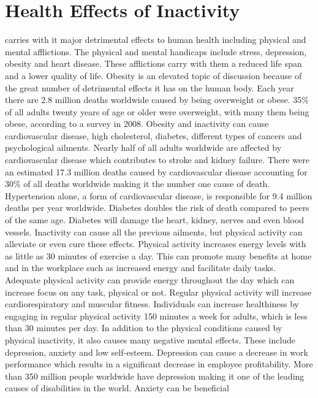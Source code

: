 \documentclass[12pt,article]{IEEEtran}
\begin{document}
	\section{Health Effects of Inactivity}
	 carries with it major detrimental effects to human health including physical and mental afflictions. 
	The physical and mental handicaps include stress, depression, obesity and heart disease. These afflictions carry with them a reduced 
	life span and a lower quality of life.
	Obesity is an elevated topic of discussion because of the great number of detrimental effects it has on the human body. Each year there 
	are 2.8 million deaths worldwide caused by being overweight or obese. 35\% of all adults twenty years of age or older were overweight, 
	with many them being obese, according to a survey in 2008. \cite{14} Obesity and inactivity can cause cardiovascular disease, high cholesterol, 
	diabetes, different types of cancers and psychological ailments. Nearly half of all adults worldwide are affected by cardiovascular disease
	which contributes to stroke and kidney failure. There were an estimated 17.3 million deaths caused by cardiovascular disease accounting for 
	30\% of all deaths worldwide making it the number one cause of death. \cite{4}  Hypertension alone, a form of cardiovascular disease, is responsible 
	for 9.4 million deaths per year worldwide. \cite{3} Diabetes doubles the risk of death compared to peers of the same age. Diabetes will damage the 
	heart, kidney, nerves and even blood vessels. \cite{15}
	Inactivity can cause all the previous ailments, but physical activity can alleviate or even cure these effects. Physical activity increases energy 
	levels with as little as 30 minutes of exercise a day. \cite{16} This can promote many benefits at home and in the workplace such as increased 
	energy and facilitate daily tasks. Adequate physical activity can provide energy throughout the day which can increase focus on any task, physical 
	or not. \cite{17} Regular physical activity will increase cardiorespiratory and muscular fitness. \cite{3} Individuals can increase healthiness by 
	engaging in regular physical activity 150 minutes a week for adults, which is less than 30 minutes per day. \cite{18}
	In addition to the physical conditions caused by physical inactivity, it also causes many negative mental effects. These include depression, anxiety 
	and low self-esteem. Depression can cause a decrease in work performance which results in a significant decrease in employee profitability. \cite{11} 
	More than 350 million people worldwide have depression making it one of the leading causes of disabilities in the world. \cite{12} Anxiety can be beneficial 
\end{document}
